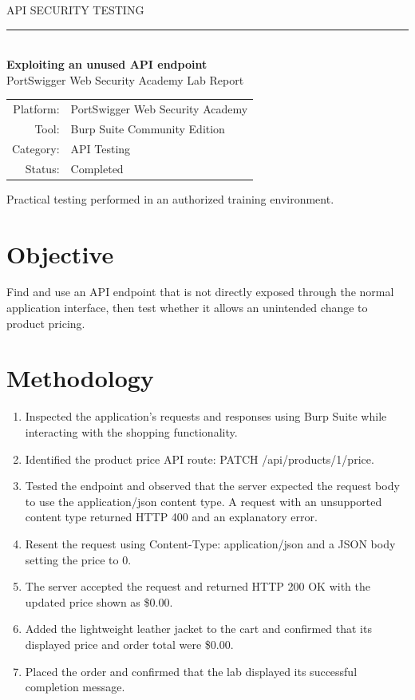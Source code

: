 \documentclass[11pt,a4paper]{article}
\begin{document}
\begin{titlepage}
\centering
\vspace*{25mm}
{\Large API SECURITY TESTING\\[4mm]}
\rule{\textwidth}{1pt}\\[8mm]
{\huge\bfseries Exploiting an unused API endpoint\\[8mm]}
{\large PortSwigger Web Security Academy Lab Report\\[4mm]}
\vfill
\begin{tabular}{rl}
Platform: & PortSwigger Web Security Academy\\
Tool: & Burp Suite Community Edition\\
Category: & API Testing\\
Status: & Completed\\
\end{tabular}
\vfill
{\small Practical testing performed in an authorized training environment.}
\end{titlepage}
\tableofcontents
\newpage
\section{Objective}
Find and use an API endpoint that is not directly exposed through the normal application interface, then test whether it allows an unintended change to product pricing.
\section{Methodology}
\begin{enumerate}
\item Inspected the application’s requests and responses using Burp Suite while interacting with the shopping functionality.
\item Identified the product price API route: PATCH /api/products/1/price.
\item Tested the endpoint and observed that the server expected the request body to use the application/json content type. A request with an unsupported content type returned HTTP 400 and an explanatory error.
\item Resent the request using Content-Type: application/json and a JSON body setting the price to 0.
\item The server accepted the request and returned HTTP 200 OK with the updated price shown as \$0.00.
\item Added the lightweight leather jacket to the cart and confirmed that its displayed price and order total were \$0.00.
\item Placed the order and confirmed that the lab displayed its successful completion message.
\end{enumerate}
\end{document}
